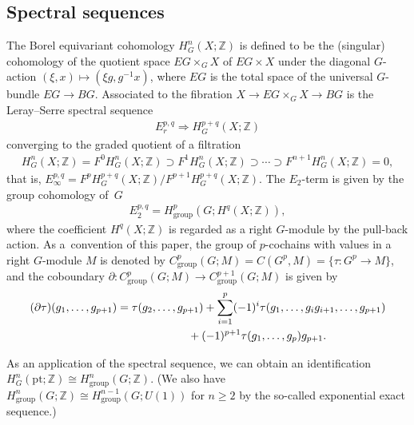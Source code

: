 \documentclass[11pt]{article}
\theoremstyle{definition}
\newcommand{\Z}{\mathbb{Z}}
\newcommand{\pt}{\mathrm{pt}}
\begin{document}
\subsection{Spectral sequences}

The Borel equivariant cohomology $H^n_G(X; \Z)$ is def\/ined to be the (singular) cohomology of the quotient space $EG \times_G X$ of $EG \times X$ under the diagonal $G$-action $(\xi, x) \mapsto (\xi g, g^{-1}x)$, where $EG$ is the total space of the universal $G$-bundle $EG \to BG$. Associated to the f\/ibration $X \to EG \times_G X \to BG$ is the Leray--Serre spectral sequence
\begin{gather*}
E_r^{p, q} \Longrightarrow H^{p+q}_G(X; \Z)
\end{gather*}
converging to the graded quotient of a f\/iltration
\begin{gather*}
H^n_G(X; \Z) = F^0H^n_G(X; \Z) \supset F^1H^n_G(X; \Z) \supset \cdots \supset F^{n+1}H^n_G(X; \Z) = 0,
\end{gather*}
that is, $E_\infty^{p, q} = F^pH^{p+q}_G(X; \Z)/F^{p+1}H^{p+q}_G(X; \Z)$. The $E_2$-term is given by the group cohomology of~$G$
\begin{gather*}
E_2^{p, q} = H^p_{\mathrm{group}}(G; H^q(X; \Z)),
\end{gather*}
where the coef\/f\/icient $H^q(X; \Z)$ is regarded as a right $G$-module by the pull-back action. As a~convention of this paper, the group of $p$-cochains with values in a right $G$-module $M$ is denoted by $C^p_{\mathrm{group}}(G; M) = C(G^p, M) = \{ \tau \colon G^p \to M \}$, and the coboundary $\partial \colon C^p_{\mathrm{group}}(G; M) \to C^{p+1}_{\mathrm{group}}(G; M)$ is given by
\begin{gather*}
(\partial \tau)(g_1, \ldots, g_{p+1})= \tau(g_2, \ldots, g_{p+1})+ \sum_{i = 1}^p (-1)^i \tau(g_1, \ldots, g_ig_{i+1}, \ldots, g_{p+1}) \\
\hphantom{(\partial \tau)(g_1, \ldots, g_{p+1})=}{}+ (-1)^{p+1} \tau(g_1, \ldots, g_p)g_{p+1}.
\end{gather*}

As an application of the spectral sequence, we can obtain an identif\/ication $H^n_G(\pt; \Z) \cong H^n_{\mathrm{group}}(G; \Z)$. (We also have $H^n_{\mathrm{group}}(G; \Z) \cong H^{n-1}_{\mathrm{group}}(G; U(1))$ for $n \ge 2$ by the so-called exponential exact sequence.)

\setcounter{section}{4}
\setcounter{subsection}{0}
\setcounter{subsubsection}{0}
\setcounter{thm}{0}
\setcounter{equation}{0}
\end{document}
